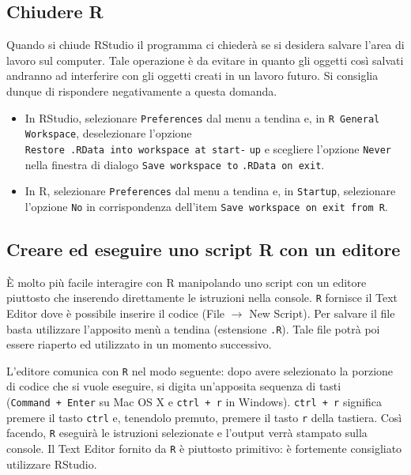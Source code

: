 \documentclass[
  11pt,
]{krantz}
\theoremstyle{definition}
\theoremstyle{definition}
\theoremstyle{definition}
\theoremstyle{definition}
\theoremstyle{remark}
\begin{document}
\hypertarget{chiudere-r}{%
\subsection{Chiudere R}\label{chiudere-r}}

Quando si chiude RStudio il programma ci chiederà se si desidera salvare l'area di lavoro sul computer. Tale operazione è da evitare in quanto gli oggetti così salvati andranno ad interferire con gli oggetti creati in un lavoro futuro. Si consiglia dunque di rispondere negativamente a questa domanda.

\begin{itemize}
\item
  In RStudio, selezionare \texttt{Preferences} dal menu a tendina e, in \texttt{R\ General} \texttt{Workspace}, deselezionare l'opzione \texttt{Restore\ .RData\ into\ workspace\ at\ start-} \texttt{up} e scegliere l'opzione \texttt{Never} nella finestra di dialogo \texttt{Save\ workspace\ to} \texttt{.RData\ on\ exit}.
\item
  In R, selezionare \texttt{Preferences} dal menu a tendina e, in \texttt{Startup}, selezionare l'opzione \texttt{No} in corrispondenza dell'item \texttt{Save\ workspace\ on\ exit\ from\ R}.
\end{itemize}

\hypertarget{creare-ed-eseguire-uno-script-r-con-un-editore}{%
\subsection{Creare ed eseguire uno script R con un editore}\label{creare-ed-eseguire-uno-script-r-con-un-editore}}

È molto più facile interagire con R manipolando uno script con un editore piuttosto che inserendo direttamente le istruzioni nella console. \texttt{R} fornisce il Text Editor dove è possibile inserire il codice (File \(\to\) New Script). Per salvare il file basta utilizzare l'apposito menù a tendina (estensione \texttt{.R}). Tale file potrà poi essere riaperto ed utilizzato in un momento successivo.

L'editore comunica con \texttt{R} nel modo seguente: dopo avere selezionato la porzione di codice che si vuole eseguire, si digita un'apposita sequenza di tasti (\texttt{Command\ +\ Enter} su Mac OS X e \texttt{ctrl\ +\ r} in Windows). \texttt{ctrl\ +\ r} significa premere il tasto \texttt{ctrl} e, tenendolo premuto, premere il tasto \texttt{r} della tastiera. Così facendo, \texttt{R} eseguirà le istruzioni selezionate e l'output verrà stampato sulla console. Il Text Editor fornito da \texttt{R} è piuttosto primitivo: è fortemente consigliato utilizzare RStudio.
\end{document}
